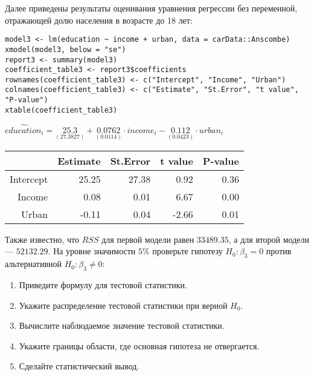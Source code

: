 \begin{problem}
\begin{enumerate}
Далее приведены результаты оценивания уравнения регрессии без переменной, отражающей долю населения в возрасте до 18 лет:

\begin{verbatim}
model3 <- lm(education ~ income + urban, data = carData::Anscombe)
xmodel(model3, below = "se")
report3 <- summary(model3)
coefficient_table3 <- report3$coefficients
rownames(coefficient_table3) <- c("Intercept", "Income", "Urban")
colnames(coefficient_table3) <- c("Estimate", "St.Error", "t value", "P-value")
xtable(coefficient_table3)
\end{verbatim}


\begin{center}

\ensuremath{\widehat{education}_i=\underset{( 27.3827 )}{ 25.3 }+\underset{( 0.0114)}{0.0762}\cdot income_i-\underset{( 0.0423)}{0.112}\cdot urban_i}

\begin{tabular}{rrrrr}
  \hline
 & Estimate & St.Error & t value & P-value \\
  \hline
Intercept & 25.25 & 27.38 & 0.92 & 0.36 \\
  Income & 0.08 & 0.01 & 6.67 & 0.00 \\
  Urban & -0.11 & 0.04 & -2.66 & 0.01 \\
   \hline
\end{tabular}

\end{center}
Также известно, что $RSS$ для первой модели равен $33489.35$, а для второй модели — $52132.29$. На уровне значимости $5\%$ проверьте гипотезу $H_0: \beta_3 = 0$ против альтернативной $H_0: \beta_3 \not= 0$:
\begin{enumerate}
\item Приведите формулу для тестовой статистики.
\item Укажите распределение тестовой статистики при верной $H_0$.
\item Вычислите наблюдаемое значение тестовой статистики.
\item Укажите границы области, где основная гипотеза не отвергается.
\item Сделайте статистический вывод.
\end{enumerate}
\end{enumerate}


\begin{sol}
\end{sol}
\end{problem}




